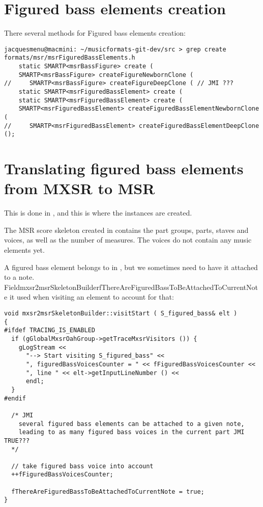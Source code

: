 \section{Figured bass elements creation}

There several methods for Figured bass elements creation:%
\begin{lstlisting}[language=Terminal]
jacquesmenu@macmini: ~/musicformats-git-dev/src > grep create formats/msr/msrFiguredBassElements.h
    static SMARTP<msrBassFigure> create (
    SMARTP<msrBassFigure> createFigureNewbornClone (
//     SMARTP<msrBassFigure> createFigureDeepClone ( // JMI ???
    static SMARTP<msrFiguredBassElement> create (
    static SMARTP<msrFiguredBassElement> create (
    SMARTP<msrFiguredBassElement> createFiguredBassElementNewbornClone (
//     SMARTP<msrFiguredBassElement> createFiguredBassElementDeepClone ();
\end{lstlisting}


\section{Translating figured bass elements from MXSR to MSR}

This is done in \mxsrToMsr{}, and this is where the  instances are created.

The MSR score skeleton created in  contains the part groups, parts, staves and voices, as well as the number of measures. The voices do not contain any music elements yet.

A figured bass element belongs to  in \mxml, but we sometimes need to have it attached to a note.\\
Field{mxsr2msrSkeletonBuilder}{fThereAreFiguredBassToBeAttachedToCurrentNote} it used when visiting an  element to account for that:%
\begin{lstlisting}[language=CPlusPlus]
void mxsr2msrSkeletonBuilder::visitStart ( S_figured_bass& elt )
{
#ifdef TRACING_IS_ENABLED
  if (gGlobalMxsrOahGroup->getTraceMxsrVisitors ()) {
    gLogStream <<
      "--> Start visiting S_figured_bass" <<
      ", figuredBassVoicesCounter = " << fFiguredBassVoicesCounter <<
      ", line " << elt->getInputLineNumber () <<
      endl;
  }
#endif

  /* JMI
    several figured bass elements can be attached to a given note,
    leading to as many figured bass voices in the current part JMI TRUE???
  */

  // take figured bass voice into account
  ++fFiguredBassVoicesCounter;

  fThereAreFiguredBassToBeAttachedToCurrentNote = true;
}
\end{lstlisting}

